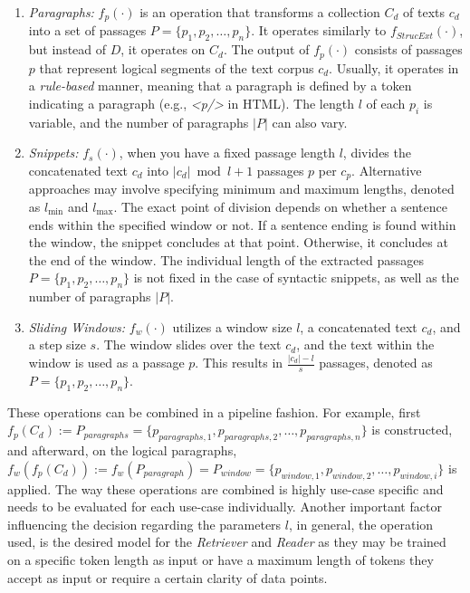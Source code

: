 \begin{enumerate}
    \item \textit{Paragraphs:} $f_p(\cdot)$ is an operation that transforms a collection $C_d$ of texts $c_d$ into a set of passages $P = \{p_1, p_2, \dots, p_n\}$. It operates similarly to $f_{StrucExt}(\cdot)$, but instead of $D$, it operates on $C_d$. The output of $f_p(\cdot)$ consists of passages $p$ that represent logical segments of the text corpus $c_d$. Usually, it operates in a \textit{rule-based} manner, meaning that a paragraph is defined by a token indicating a paragraph (e.g., \textit{<p/>} in HTML). The length $l$ of each $p_i$ is variable, and the number of paragraphs $|P|$ can also vary.
    \item \textit{Snippets:} $f_s(\cdot)$, when you have a fixed passage length $l$, divides the concatenated text $c_d$ into $|c_d|\bmod{l} + 1$ passages $p$ per $c_p$. Alternative approaches may involve specifying minimum and maximum lengths, denoted as $l_{\text{min}}$ and $l_{\text{max}}$. The exact point of division depends on whether a sentence ends within the specified window or not. If a sentence ending is found within the window, the snippet concludes at that point. Otherwise, it concludes at the end of the window. The individual length of the extracted passages $P = \{p_1, p_2, \ldots, p_n\}$ is not fixed in the case of syntactic snippets, as well as the number of paragraphs $|P|$.
    \item \textit{Sliding Windows:} $f_w(\cdot)$ utilizes a window size $l$, a concatenated text $c_d$, and a step size $s$. The window slides over the text $c_d$, and the text within the window is used as a passage $p$. This results in $\frac{|c_d| - l}{s}$ passages, denoted as $P = \{p_1, p_2, \ldots, p_n\}$.
\end{enumerate}

These operations can be combined in a pipeline fashion. For example, first $f_p(C_d) := P_{paragraphs} = \{p_{paragraphs,1}, p_{paragraphs,2}, \dots, p_{paragraphs,n}\}$ is constructed, and afterward, on the logical paragraphs, $f_w(f_p(C_d)) := f_w(P_{paragraph}) = P_{window} = \{p_{window,1}, \allowbreak p_{window,2}, \allowbreak \dots, p_{window,i}\}$ is applied. The way these operations are combined is highly use-case specific and needs to be evaluated for each use-case individually. Another important factor influencing the decision regarding the parameters $l$, in general, the operation used, is the desired model for the \textit{Retriever} and \textit{Reader} as they may be trained on a specific token length as input or have a maximum length of tokens they accept as input or require a certain clarity of data points.


